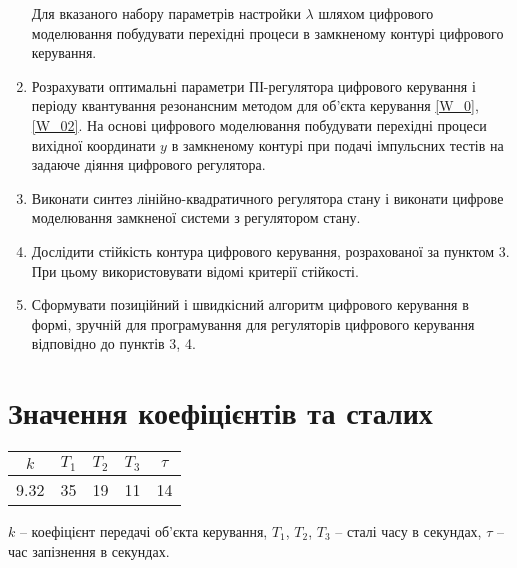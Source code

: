 \begin{enumerate}
        Для вказаного набору параметрів настройки $\lambda$ шляхом цифрового моделювання побудувати перехідні процеси в замкненому контурі цифрового керування.
    \item  Розрахувати оптимальні параметри ПІ-регулятора цифрового керування і 
        періоду квантування резонансним методом для об'єкта керування \eqref{W_0}, \eqref{W_02}. На основі цифрового моделювання побудувати перехідні процеси 
        вихідної координати $y$ в замкненому контурі при подачі імпульсних тестів 
        на задаюче діяння цифрового регулятора. 
    \item Виконати синтез лінійно-квадратичного регулятора стану і виконати 
        цифрове моделювання замкненої системи з регулятором стану. 
    \item Дослідити стійкість контура цифрового керування, розрахованої за 
        пунктом 3. При цьому використовувати відомі критерії стійкості. 
    \item Сформувати позиційний і швидкісний алгоритм цифрового керування в формі, зручній для програмування для регуляторів цифрового керування відповідно до пунктів 3, 4.
\end{enumerate}

\section{Значення коефіцієнтів та сталих}
\begin{center}
    \begin{tabular}{|c|c|c|c|c|}
        \hline
        $k$ & $T_1$ & $T_2$ & $T_3$ & $\tau$ \\
        \hline
        9.32 & 35 & 19 & 11 & 14 \\ 
        \hline
    \end{tabular}
\end{center}
$k$ -- коефіцієнт передачі об'єкта керування, $T_1$, $T_2$, $T_3$ -- сталі часу в секундах, $\tau$ -- час запізнення в секундах.